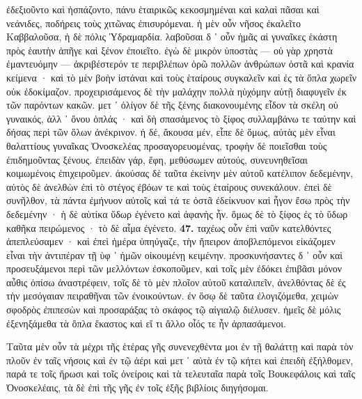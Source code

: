 \documentclass[a4paper, 11pt, oneside, polutonikogreek, german]{article}
\begin{document}
ἐδεξιοῦντο καὶ ἠσπάζοντο, πάνυ ἑταιρικῶς κεκοσμημέναι καὶ καλαὶ πᾶσαι καὶ νεάνιδες, ποδήρεις τοὺς χιτῶνας ἐπισυρόμεναι. ἡ μὲν οὖν νῆσος ἐκαλεῖτο Καββαλοῦσα, ἡ δὲ πόλις Ὑδραμαρδία. λαβοῦσαι δ ᾽ οὖν ἡμᾶς αἱ γυναῖκες ἑκάστη πρὸς ἑαυτὴν ἀπῆγε καὶ ξένον ἐποιεῖτο. ἐγὼ δὲ μικρὸν ὑποστὰς --- οὐ γὰρ χρηστὰ ἐμαντευόμην --- ἀκριβέστερόν τε περιβλέπων ὁρῶ πολλῶν ἀνθρώπων ὀστᾶ καὶ κρανία κείμενα · καὶ τὸ μὲν βοὴν ἱστάναι καὶ τοὺς ἑταίρους συγκαλεῖν καὶ ἐς τὰ ὅπλα χωρεῖν οὐκ ἐδοκίμαζον. προχειρισάμενος δὲ τὴν μαλάχην πολλὰ ηὐχόμην αὐτῇ διαφυγεῖν ἐκ τῶν παρόντων κακῶν. μετ ᾽ ὀλίγον δὲ τῆς ξένης διακονουμένης εἶδον τὰ σκέλη οὐ γυναικός, ἀλλ ᾽ ὄνου ὁπλάς · καὶ δὴ σπασάμενος τὸ ξίφος συλλαμβάνω τε ταύτην καὶ δήσας περὶ τῶν ὅλων ἀνέκρινον. ἡ δέ, ἄκουσα μέν, εἶπε δὲ ὅμως, αὐτὰς μὲν εἶναι θαλαττίους γυναῖκας Ὀνοσκελέας προσαγορευομένας, τροφὴν δὲ ποιεῖσθαι τοὺς ἐπιδημοῦντας ξένους. ἐπειδὰν γάρ, ἔφη, μεθύσωμεν αὐτούς, συνευνηθεῖσαι κοιμωμένοις ἐπιχειροῦμεν. ἀκούσας δὲ ταῦτα ἐκείνην μὲν αὐτοῦ κατέλιπον δεδεμένην, αὐτὸς δὲ ἀνελθὼν ἐπὶ τὸ στέγος ἐβόων τε καὶ τοὺς ἑταίρους συνεκάλουν. ἐπεὶ δὲ συνῆλθον, τὰ πάντα ἐμήνυον αὐτοῖς καὶ τά τε ὀστᾶ ἐδείκνυον καὶ ἦγον ἔσω πρὸς τὴν δεδεμένην · ἡ δὲ αὐτίκα ὕδωρ ἐγένετο καὶ ἀφανὴς ἦν. ὅμως δὲ τὸ ξίφος ἐς τὸ ὕδωρ καθῆκα πειρώμενος · τὸ δὲ αἷμα ἐγένετο. \textbf{47.} ταχέως οὖν ἐπὶ ναῦν κατελθόντες ἀπεπλεύσαμεν · καὶ ἐπεὶ ἡμέρα ὑπηύγαζε, τὴν ἤπειρον ἀποβλεπόμενοι εἰκάζομεν εἶναι τὴν ἀντιπέραν τῇ ὑφ ᾽ ἡμῶν οἰκουμένῃ κειμένην. προσκυνήσαντες δ ᾽ οὖν καὶ προσευξάμενοι περὶ τῶν μελλόντων ἐσκοποῦμεν, καὶ τοῖς μὲν ἐδόκει ἐπιβᾶσι μόνον αὖθις ὀπίσω ἀναστρέφειν, τοῖς δὲ τὸ μὲν πλοῖον αὐτοῦ καταλιπεῖν, ἀνελθόντας δὲ ἐς τὴν μεσόγαιαν πειραθῆναι τῶν ἐνοικούντων. ἐν ὅσῳ δὲ ταῦτα ἐλογιζόμεθα, χειμὼν σφοδρὸς ἐπιπεσὼν καὶ προσαράξας τὸ σκάφος τῷ αἰγιαλῷ διέλυσεν. ἡμεῖς δὲ μόλις ἐξενηξάμεθα τὰ ὅπλα ἕκαστος καὶ εἴ τι ἄλλο οἷός τε ἦν ἁρπασάμενοι.

Ταῦτα μὲν οὖν τὰ μέχρι τῆς ἑτέρας γῆς συνενεχθέντα μοι ἐν τῇ θαλάττῃ καὶ παρὰ τὸν πλοῦν ἐν ταῖς νήσοις καὶ ἐν τῷ ἀέρι καὶ μετ ᾽ αὐτὰ ἐν τῷ κήτει καὶ ἐπειδὴ ἐξήλθομεν, παρά τε τοῖς ἥρωσι καὶ τοῖς ὀνείροις καὶ τὰ τελευταῖα παρὰ τοῖς Βουκεφάλοις καὶ ταῖς Ὀνοσκελέαις, τὰ δὲ ἐπὶ τῆς γῆς ἐν τοῖς ἑξῆς βιβλίοις διηγήσομαι.
\clearpage
\end{document}
